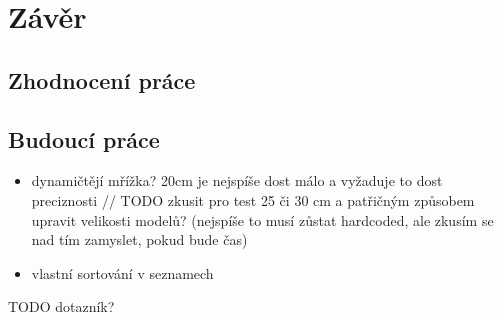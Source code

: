 
\chapter{Závěr}


\section{Zhodnocení práce}


\section{Budoucí práce}


\begin{itemize}
	\item dynamičtějí mřížka? 20cm je nejspíše dost málo a vyžaduje to dost preciznosti // TODO zkusit pro test 25 či 30 cm a patřičným způsobem upravit velikosti modelů? (nejspíše to musí zůstat hardcoded, ale zkusím se nad tím zamyslet, pokud bude čas)
	\item vlastní sortování v seznamech

\end{itemize}

TODO dotazník?
